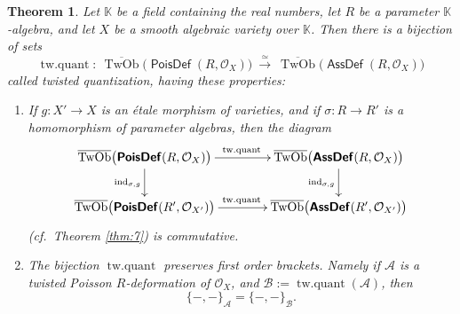 \documentclass[a4paper, 10pt]{amsart}
\newtheorem{thm}[equation]{Theorem}
\theoremstyle{definition}
\numberwithin{equation}{section}
\newcommand{\iso}{\xrightarrow{\simeq}}
\newcommand{\opn}{\operatorname}
\newcommand{\cat}[1]{\operatorname{\mathsf{#1}}}
\newcommand{\ol}{\overline}
\newcommand{\rmitem}[1]{\item[\text{\textup{(#1)}}]}
\newcommand{\mcal}[1]{\mathcal{#1}}
\newcommand{\mbb}[1]{\mathbb{#1}}
\newcommand{\tup}[1]{\textup{#1}}
\newcommand{\bsym}[1]{\boldsymbol{#1}}
\newcommand{\K}{\mbb{K}}
\newcommand{\gerbe}[1]{\bsym{\mcal{#1}}}
\newcommand{\twocat}[1]{\operatorname{\bsym{\cat{#1}}}}
\begin{document}
\begin{thm} \label{thm:8}
Let $\K$ be a field containing the real numbers, let $R$ be a 
parameter $\K$-algebra, and let $X$ be a smooth algebraic variety over
$\K$. Then there is a bijection of sets
\[ \opn{tw{.}quant} : \
\ol{\opn{TwOb}} \bigl( \twocat{PoisDef}(R, \mcal{O}_X) \bigr) 
\ \iso \
\ol{\opn{TwOb}} \bigl( \twocat{AssDef}(R, \mcal{O}_X) \bigr) \] 
called  {\em twisted quantization}, having these
properties\tup{:}
\begin{enumerate}
\rmitem{i} If $g : X' \to X$ is an \'etale morphism of varieties, and
if $\sigma : R \to R'$ is a homomorphism of parameter algebras, then
the diagram
\[ \UseTips \xymatrix @C=9ex @R=5ex {
\ol{\opn{TwOb}} \bigl( \twocat{PoisDef}(R, \mcal{O}_X) \bigr)
\ar[r]^{\opn{tw{.}quant}}
\ar[d]_{\opn{ind}_{\sigma, g}}
& 
\ol{\opn{TwOb}} \bigl( \twocat{AssDef}(R, \mcal{O}_X) \bigr)
\ar[d]_{\opn{ind}_{\sigma, g}} 
\\
\ol{\opn{TwOb}} \bigl( \twocat{PoisDef}(R', \mcal{O}_{X'}) \bigr)
\ar[r]^{\opn{tw{.}quant}}
& 
\ol{\opn{TwOb}} \bigl( \twocat{AssDef}(R', \mcal{O}_{X'}) \bigr)
} \]
\tup{(}cf.\ Theorem \tup{\ref{thm:7})} is commutative.
%
\rmitem{ii} The bijection $\opn{tw{.}quant}$ preserves first order brackets.
Namely if 
$\gerbe{A}$ is a twisted Poisson $R$-deformation of
$\mcal{O}_X$, and $\gerbe{B} := \opn{tw{.}quant}(\gerbe{A})$, 
then 
\[ \{ -,- \}_{\gerbe{A}} = \{ -,- \}_{\gerbe{B}} . \]
\end{enumerate}
\end{thm}
\end{document}
